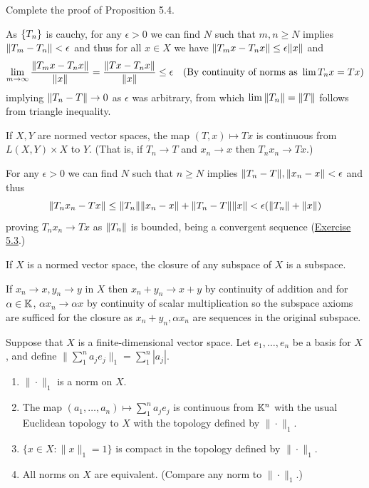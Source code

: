 \documentclass[12pt,a4paper]{article}
\begin{document}
\begin{problem}\label{prob:5-3}
Complete the proof of Proposition 5.4.
\end{problem}
\begin{solution}
    As $ \qty{T_n}$ is cauchy, for any $\epsilon>0$ we can find $N$ such that $m,n\geq N$ implies $\norm{T_m-T_n}<\epsilon$ and thus for all $x\in X$ we have $\norm{T_mx-T_nx}\leq\epsilon\norm{x}$ and 
    \[
        \lim_{m\to\infty} \frac{ \norm{T_mx-T_nx}}{ \norm{x}}= \frac{ \norm{Tx-T_nx}}{ \norm{x}}\leq\epsilon\quad\text{(By continuity of norms as }\lim T_nx=Tx) 
    \]
    implying $ \norm{T_n-T}\to 0$ as $\epsilon$ was arbitrary, from which $\lim \norm{T_n}= \norm{T}$ follows from triangle inequality. 
\end{solution}
\begin{problem}\label{prob:5-4}
If $X, Y$ are normed vector spaces, the map $(T,x) \mapsto Tx$ is continuous from $L(X,Y) \times X$ to $Y$. (That is, if $T_n \rightarrow T$ and $x_n \rightarrow x$ then $T_n x_n \rightarrow Tx$.)
\end{problem}
\begin{solution}
For any $\epsilon>0$ we can find $N$ such that $n\geq N$ implies $ \norm{T_n-T}, \norm{x_n-x}<\epsilon$ and thus
\[
    \norm{T_nx_n-Tx}
    \leq\norm{T_n}\norm{x_n-x}+ \norm{T_n-T} \norm{x}<\epsilon( \norm{T_n}+ \norm{x})
\]
proving $T_nx_n\to Tx$ as $\norm{T_n}$ is bounded, being a convergent sequence (\hyperref[prob:5-3]{Exercise 5.3}.)
\end{solution}
\begin{problem}\label{prob:5-5}
If $X$ is a normed vector space, the closure of any subspace of $X$ is a subspace.
\end{problem}
If $x_n\to x,y_n\to y$ in $X$ then $x_n+y_n\to x+y$ by continuity of addition and for $\alpha\in\mathbb{K}$, $\alpha x_n\to\alpha x$ by continuity of scalar multiplication so the subspace axioms are sufficed for the closure as $x_n+y_n,\alpha x_n$ are sequences in the original subspace. 
\begin{problem}\label{prob:5-6}
Suppose that $X$ is a finite-dimensional vector space. Let $e_1,\dots,e_n$ be a basis for $X$, and define $\|\sum_{1}^{n} a_j e_j\|_1 = \sum_{1}^{n} |a_j|$.
\begin{enumerate}[label=\alph*.]
\item $\|\cdot\|_1$ is a norm on $X$.
\item The map $(a_1,\dots,a_n) \mapsto \sum_{1}^{n} a_j e_j$ is continuous from $\mathbb{K}^n$ with the usual Euclidean topology to $X$ with the topology defined by $\|\cdot\|_1$.
\item $\{x \in X : \|x\|_1 = 1\}$ is compact in the topology defined by $\|\cdot\|_1$.
\item All norms on $X$ are equivalent. (Compare any norm to $\|\cdot\|_1$.)
\end{enumerate}
\end{problem}
\end{document}
